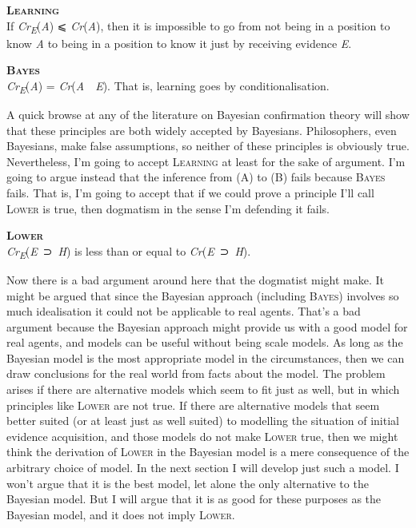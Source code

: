 \documentclass[
  10pt,
  letterpaper,
  DIV=11,
  numbers=noendperiod,
  twoside]{scrartcl}
\begin{document}
\textsc{\textbf{Learning}}\\
If \emph{Cr\textsubscript{E}}(\emph{A}) ⩽ \emph{Cr}(\emph{A}), then it
is impossible to go from not being in a position to know \emph{A} to
being in a position to know it just by receiving evidence \emph{E}.

\textsc{\textbf{Bayes}}\\
\emph{Cr\textsubscript{E}}(\emph{A}) =
\emph{Cr}(\emph{A}~\textbar~\emph{E}). That is, learning goes by
conditionalisation.

A quick browse at any of the literature on Bayesian confirmation theory
will show that these principles are both widely accepted by Bayesians.
Philosophers, even Bayesians, make false assumptions, so neither of
these principles is obviously true. Nevertheless, I'm going to accept
\textsc{Learning} at least for the sake of argument. I'm going to argue
instead that the inference from (A) to (B) fails because \textsc{Bayes}
fails. That is, I'm going to accept that if we could prove a principle
I'll call \textsc{Lower} is true, then dogmatism in the sense I'm
defending it fails.

\textsc{\textbf{Lower}}\\
\emph{Cr\textsubscript{E}}(\emph{E}~⊃~\emph{H}) is less than or equal to
\emph{Cr}(\emph{E}~⊃~\emph{H}).

Now there is a bad argument around here that the dogmatist might make.
It might be argued that since the Bayesian approach (including
\textsc{Bayes}) involves so much idealisation it could not be applicable
to real agents. That's a bad argument because the Bayesian approach
might provide us with a good model for real agents, and models can be
useful without being scale models. As long as the Bayesian model is the
most appropriate model in the circumstances, then we can draw
conclusions for the real world from facts about the model. The problem
arises if there are alternative models which seem to fit just as well,
but in which principles like \textsc{Lower} are not true. If there are
alternative models that seem better suited (or at least just as well
suited) to modelling the situation of initial evidence acquisition, and
those models do not make \textsc{Lower} true, then we might think the
derivation of \textsc{Lower} in the Bayesian model is a mere consequence
of the arbitrary choice of model. In the next section I will develop
just such a model. I won't argue that it is the best model, let alone
the only alternative to the Bayesian model. But I will argue that it is
as good for these purposes as the Bayesian model, and it does not imply
\textsc{Lower}.
\end{document}

